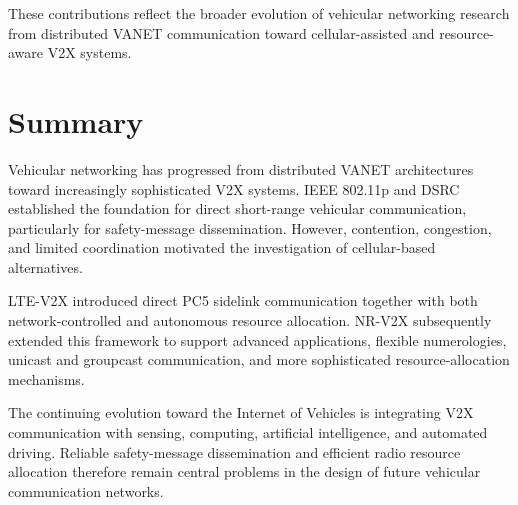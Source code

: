 These contributions reflect the broader evolution of vehicular networking
research from distributed VANET communication toward cellular-assisted and
resource-aware V2X systems.

\section{Summary}
\label{sec:vehicular_summary}

Vehicular networking has progressed from distributed VANET architectures
toward increasingly sophisticated V2X systems. IEEE 802.11p and DSRC
established the foundation for direct short-range vehicular communication,
particularly for safety-message dissemination. However, contention,
congestion, and limited coordination motivated the investigation of
cellular-based alternatives.

LTE-V2X introduced direct PC5 sidelink communication together with both
network-controlled and autonomous resource allocation. NR-V2X subsequently
extended this framework to support advanced applications, flexible
numerologies, unicast and groupcast communication, and more sophisticated
resource-allocation mechanisms.

The continuing evolution toward the Internet of Vehicles is integrating V2X
communication with sensing, computing, artificial intelligence, and automated
driving. Reliable safety-message dissemination and efficient radio resource
allocation therefore remain central problems in the design of future
vehicular communication networks.

